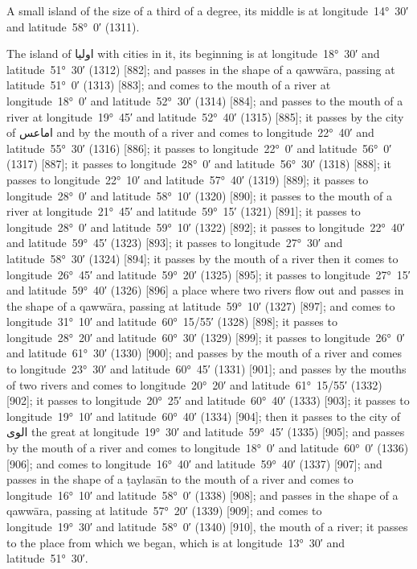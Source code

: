 \documentclass[11pt]{article}
\newcommand{\Pg}[1]{\marginpar{\footnotesize #1}}
\begin{document}
A small island of the size of a third of a degree, its middle is at longitude~14°~30′ and latitude~58°~0′ (1311).

The island of \textarabic{اوليا} with cities in it, its beginning is at longitude~18°~30′ and latitude~51°~30′ (1312) [882]; and passes in the shape of a qawwāra, passing at latitude~51°~0′ (1313) [883]; and comes to the mouth of a river at longitude~18°~0′ and latitude~52°~30′ (1314) [884]; and passes to the mouth of a river at longitude~19°~45′ and latitude~52°~40′ (1315) [885]; it passes by the city of \textarabic{اماعس} and by the mouth of a river and comes to longitude~22°~40′ and latitude~55°~30′ (1316) [886]; it passes to longitude~22°~0′ and latitude~56°~0′ (1317) [887]; it passes to longitude~28°~0′ and latitude~56°~30′ (1318) [888]; it passes to longitude~22°~10′ and latitude~57°~40′ (1319) [889]; it passes to longitude~28°~0′ and latitude~58°~10′ (1320) [890]; it passes to the mouth of a river at longitude~21°~45′ and latitude~59°~15′ (1321) [891]; it passes to longitude~28°~0′ and latitude~59°~10′ (1322) [892]; it passes to longitude~22°~40′ and latitude~59°~45′ (1323) [893]; it passes to longitude~27°~30′ and latitude~58°~30′ (1324) [894]; it passes by the mouth of a river then it comes to longitude~26°~45′ and latitude~59°~20′ (1325) [895]; it passes to longitude~27°~15′ and latitude~59°~40′ (1326) [896] a place where two rivers flow out and passes in the shape of a qawwāra, passing at latitude~59°~10′ (1327) [897]\Pg{p. 87}; and comes to longitude~31°~10′ and latitude~60°~15/55′ (1328) [898]; it passes to longitude~28°~20′ and latitude~60°~30′ (1329) [899]; it passes to longitude~26°~0′ and latitude~61°~30′ (1330) [900]; and passes by the mouth of a river and comes to longitude~23°~30′ and latitude~60°~45′ (1331) [901]; and passes by the mouths of two rivers and comes to longitude~20°~20′ and latitude~61°~15/55′ (1332) [902]; it passes to longitude~20°~25′ and latitude~60°~40′ (1333) [903]; it passes to longitude~19°~10′ and latitude~60°~40′ (1334) [904]; then it passes to the city of \textarabic{الوى} the great at longitude~19°~30′ and latitude~59°~45′ (1335) [905]; and passes by the mouth of a river and comes to longitude~18°~0′ and latitude~60°~0′ (1336) [906]; and comes to longitude~16°~40′ and latitude~59°~40′ (1337) [907]; and passes in the shape of a ṭaylasān to the mouth of a river and comes to longitude~16°~10′ and latitude~58°~0′ (1338) [908]; and passes in the shape of a qawwāra, passing at latitude~57°~20′ (1339) [909]; and comes to longitude~19°~30′ and latitude~58°~0′ (1340) [910], the mouth of a river; it passes to the place from which we began, which is at longitude~13°~30′ and latitude~51°~30′.
\end{document}
